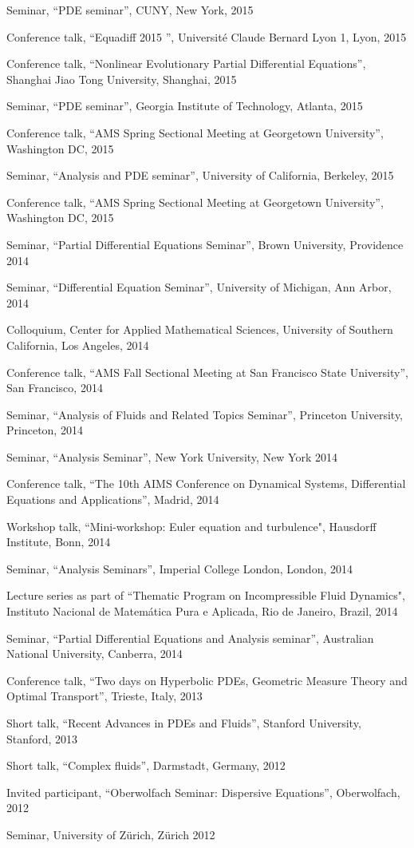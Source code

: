 \documentclass[10pt]{article}
\begin{document}
\begin{list}{}{\leftmargin=1em}
\item Seminar, ``PDE seminar'',  CUNY,  New York, 2015
\item Conference talk, ``Equadiff 2015 '',  Université Claude Bernard Lyon 1, Lyon, 2015
\item Conference talk, ``Nonlinear Evolutionary Partial Differential Equations'',  Shanghai Jiao Tong University, Shanghai, 2015
\item Seminar, ``PDE seminar'',  Georgia Institute of Technology, Atlanta, 2015
\item Conference talk, ``AMS Spring Sectional Meeting at Georgetown University'', Washington DC, 2015
\item Seminar, ``Analysis and PDE seminar'',  University of California, Berkeley, 2015
\item Conference talk, ``AMS Spring Sectional Meeting at Georgetown University'', Washington DC, 2015
\item Seminar, ``Partial Differential Equations Seminar'', Brown University, Providence 2014
\item Seminar, ``Differential Equation Seminar'', University of Michigan, Ann Arbor, 2014
\item Colloquium, Center for Applied Mathematical Sciences, University of Southern California, Los Angeles, 2014
\item Conference talk, ``AMS Fall Sectional Meeting at San Francisco State University'', San Francisco, 2014
\item Seminar, ``Analysis of Fluids and Related Topics Seminar'', Princeton University, Princeton, 2014
\item Seminar, ``Analysis Seminar'', New York University, New York 2014
\item Conference talk, ``The 10th AIMS Conference on Dynamical Systems,
Differential Equations and Applications'', Madrid, 2014 
\item Workshop talk, ``Mini-workshop: Euler equation and turbulence", Hausdorff Institute, Bonn, 2014 
\item Seminar, ``Analysis Seminars'', Imperial College London, London, 2014 
\item Lecture series as part of ``Thematic Program on Incompressible Fluid Dynamics",  Instituto Nacional de Matemática Pura e Aplicada, Rio de Janeiro, Brazil, 2014
\item Seminar, ``Partial Differential Equations and Analysis seminar'', Australian National University, Canberra, 2014
\item Conference talk, ``Two days on Hyperbolic PDEs, Geometric Measure Theory and Optimal Transport'', Trieste, Italy, 2013
\item Short talk, ``Recent Advances in PDEs and Fluids'', Stanford University, Stanford, 2013
\item Short talk, ``Complex fluids'', Darmstadt, Germany, 2012
\item Invited participant, ``Oberwolfach Seminar: Dispersive Equations'', Oberwolfach, 2012
\item Seminar, University of Zürich, Z\"urich 2012
\end{list}
\end{document}
